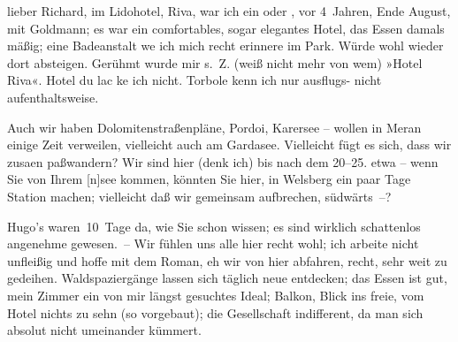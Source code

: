 \pstart{}lieber Richard,\pend\vspace{0.5em}
\pstart
           im Lidohotel, Riva, war ich ein oder \label{K_L01695-1v}\label{K_L01695-1}, vor 4 Jahren, Ende August, mit Goldmann; es war ein comfortables, sogar elegantes Hotel, das
               Essen damals mäßig; eine Badeanstalt we{\geminationn} ich mich recht
               erinnere im Park. Würde wohl wieder dort absteigen. Gerühmt wurde mir s. Z. (weiß
               nicht mehr von wem) »Hotel Riva«. Hotel du lac ke{\geminationn}
               ich nicht. Torbole kenn ich nur ausflugs- nicht
               aufenthaltsweise.\pend
           
\pstart
           Auch wir haben Dolomitenstraßenpläne, Pordoi, Karersee – wollen in Meran einige Zeit
               verweilen, vielleicht auch am Gardasee.
               Vielleicht fügt es sich, dass wir zusa{\geminationm}en paßwandern?
               Wir sind hier (denk ich) bis nach dem 20–25. etwa – wenn
               Sie von Ihrem {[}n{]}see
               kommen, könnten Sie hier, in Welsberg ein paar
               Tage {\pb}Station machen; vielleicht daß wir gemeinsam
               aufbrechen, südwärts –?\pend
           
\pstart
           Hugo’s waren 10 Tage da, wie Sie
               schon wissen; es sind wirklich schattenlos angenehme gewesen. – Wir fühlen uns alle
               hier recht wohl; ich arbeite nicht unfleißig und hoffe mit dem Roman, eh wir von hier abfahren, recht,
               sehr weit zu gedeihen. Waldspaziergänge lassen sich täglich neue entdecken; das Essen
               ist gut, mein Zimmer ein von mir längst gesuchtes Ideal; Balkon, Blick ins freie, vom
               Hotel nichts zu sehn (so vorgebaut); die Gesellschaft indifferent, da man sich
               absolut nicht umeinander kümmert.\pend
           
